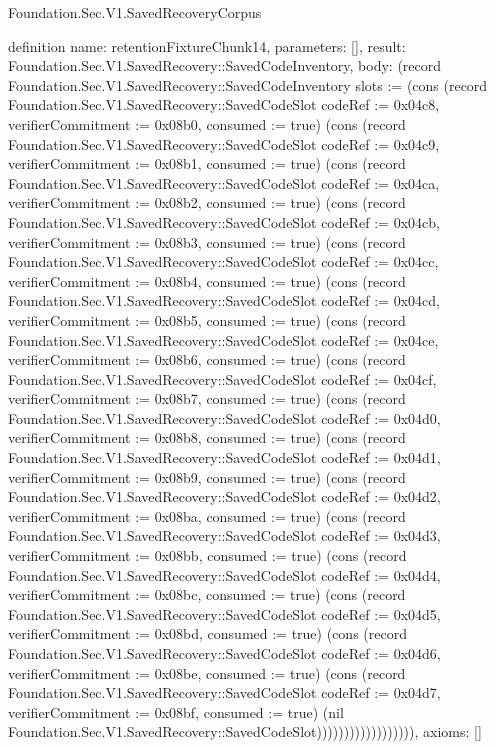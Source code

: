 \begin{lexlean}{Foundation.Sec.V1.SavedRecoveryCorpus}
\begin{semanticmodule}
definition{
  name: retentionFixtureChunk14,
  parameters: [],
  result: Foundation.Sec.V1.SavedRecovery::SavedCodeInventory,
  body: (record Foundation.Sec.V1.SavedRecovery::SavedCodeInventory {slots := (cons (record Foundation.Sec.V1.SavedRecovery::SavedCodeSlot {codeRef := 0x04c8, verifierCommitment := 0x08b0, consumed := true}) (cons (record Foundation.Sec.V1.SavedRecovery::SavedCodeSlot {codeRef := 0x04c9, verifierCommitment := 0x08b1, consumed := true}) (cons (record Foundation.Sec.V1.SavedRecovery::SavedCodeSlot {codeRef := 0x04ca, verifierCommitment := 0x08b2, consumed := true}) (cons (record Foundation.Sec.V1.SavedRecovery::SavedCodeSlot {codeRef := 0x04cb, verifierCommitment := 0x08b3, consumed := true}) (cons (record Foundation.Sec.V1.SavedRecovery::SavedCodeSlot {codeRef := 0x04cc, verifierCommitment := 0x08b4, consumed := true}) (cons (record Foundation.Sec.V1.SavedRecovery::SavedCodeSlot {codeRef := 0x04cd, verifierCommitment := 0x08b5, consumed := true}) (cons (record Foundation.Sec.V1.SavedRecovery::SavedCodeSlot {codeRef := 0x04ce, verifierCommitment := 0x08b6, consumed := true}) (cons (record Foundation.Sec.V1.SavedRecovery::SavedCodeSlot {codeRef := 0x04cf, verifierCommitment := 0x08b7, consumed := true}) (cons (record Foundation.Sec.V1.SavedRecovery::SavedCodeSlot {codeRef := 0x04d0, verifierCommitment := 0x08b8, consumed := true}) (cons (record Foundation.Sec.V1.SavedRecovery::SavedCodeSlot {codeRef := 0x04d1, verifierCommitment := 0x08b9, consumed := true}) (cons (record Foundation.Sec.V1.SavedRecovery::SavedCodeSlot {codeRef := 0x04d2, verifierCommitment := 0x08ba, consumed := true}) (cons (record Foundation.Sec.V1.SavedRecovery::SavedCodeSlot {codeRef := 0x04d3, verifierCommitment := 0x08bb, consumed := true}) (cons (record Foundation.Sec.V1.SavedRecovery::SavedCodeSlot {codeRef := 0x04d4, verifierCommitment := 0x08bc, consumed := true}) (cons (record Foundation.Sec.V1.SavedRecovery::SavedCodeSlot {codeRef := 0x04d5, verifierCommitment := 0x08bd, consumed := true}) (cons (record Foundation.Sec.V1.SavedRecovery::SavedCodeSlot {codeRef := 0x04d6, verifierCommitment := 0x08be, consumed := true}) (cons (record Foundation.Sec.V1.SavedRecovery::SavedCodeSlot {codeRef := 0x04d7, verifierCommitment := 0x08bf, consumed := true}) (nil Foundation.Sec.V1.SavedRecovery::SavedCodeSlot)))))))))))))))))}),
  axioms: []
}


\end{semanticmodule}
\end{lexlean}
